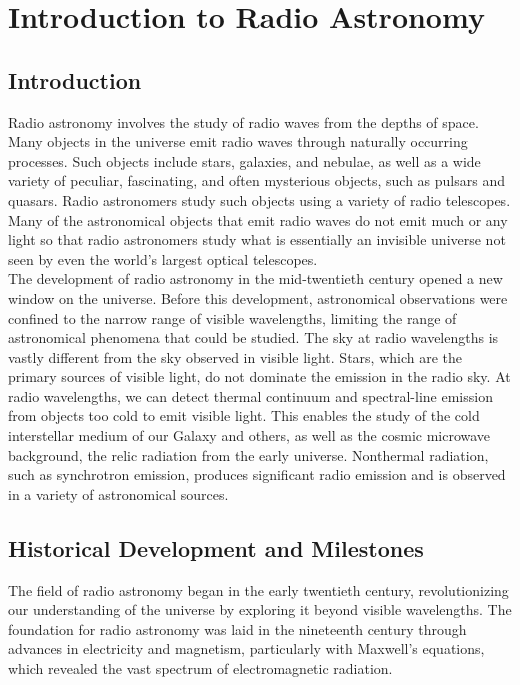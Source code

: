 \chapter{Introduction to Radio Astronomy}

\section{Introduction}
Radio astronomy involves the study of radio waves from the depths of space. Many objects in the universe emit radio waves through naturally occurring processes. Such objects include stars, galaxies, and nebulae, as well as a wide variety of peculiar, fascinating, and often mysterious objects, such as pulsars and quasars. Radio astronomers study such objects using a variety of radio telescopes. Many of the astronomical objects that emit radio waves do not emit much or any light so that radio astronomers study what is essentially an invisible universe not seen by even the world’s largest optical telescopes. \\

The development of radio astronomy in the mid-twentieth century opened a new window on the universe. Before this development, astronomical observations were confined to the narrow range of visible wavelengths, limiting the range of astronomical phenomena that could be studied. The sky at radio wavelengths is vastly different from the sky observed in visible light. Stars, which are the primary sources of visible light, do not dominate the emission in the radio sky. At radio wavelengths, we can detect thermal continuum and spectral-line emission from objects too cold to emit visible light. This enables the study of the cold interstellar medium of our Galaxy and others, as well as the cosmic microwave background, the relic radiation from the early universe. Nonthermal radiation, such as synchrotron emission, produces significant radio emission and is observed in a variety of astronomical sources.

\section{Historical Development and Milestones}

The field of radio astronomy began in the early twentieth century, revolutionizing our understanding of the universe by exploring it beyond visible wavelengths. The foundation for radio astronomy was laid in the nineteenth century through advances in electricity and magnetism, particularly with Maxwell's equations, which revealed the vast spectrum of electromagnetic radiation.

